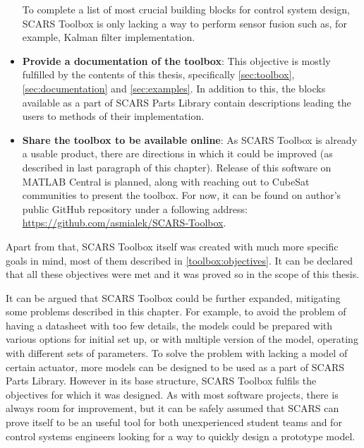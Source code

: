 \begin{itemize}
        To complete a list of most crucial building blocks for control system design, SCARS Toolbox is only lacking a way to perform sensor fusion such as, for example, Kalman filter implementation.
        \item \textbf{Provide a documentation of the toolbox}: This objective is mostly fulfilled by the contents of this thesis, specifically \autoref{sec:toolbox}, \autoref{sec:documentation} and \autoref{sec:examples}. In addition to this, the blocks available as a part of SCARS Parts Library contain descriptions leading the users to methods of their implementation. 
        \item \textbf{Share the toolbox to be available online}: As SCARS Toolbox is already a usable product, there are directions in which it could be improved (as described in last paragraph of this chapter). 
        Release of this software on MATLAB Central is planned, along with reaching out to CubeSat communities to present the toolbox. For now, it can be found on author's public GitHub repository under a following address: \url{https://github.com/asmialek/SCARS-Toolbox}.
    \end{itemize}

    Apart from that, SCARS Toolbox itself was created with much more specific goals in mind, most of them described in \autoref{toolbox:objectives}. It can be declared that all these objectives were met and it was proved so in the scope of this thesis.

    It can be argued that SCARS Toolbox could be further expanded, mitigating some problems described in this chapter. For example, to avoid the problem of having a datasheet with too few details, the models could be prepared with various options for initial set up, or with multiple version of the model, operating with different sets of parameters. To solve the problem with lacking a model of certain actuator, more models can be designed to be used as a part of SCARS Parts Library. However in its base structure, SCARS Toolbox fulfils the objectives for which it was designed. As with most software projects, there is always room for improvement, but it can be safely assumed that SCARS can prove itself to be an useful tool for both unexperienced student teams and for control systems engineers looking for a way to quickly design a prototype model. 


